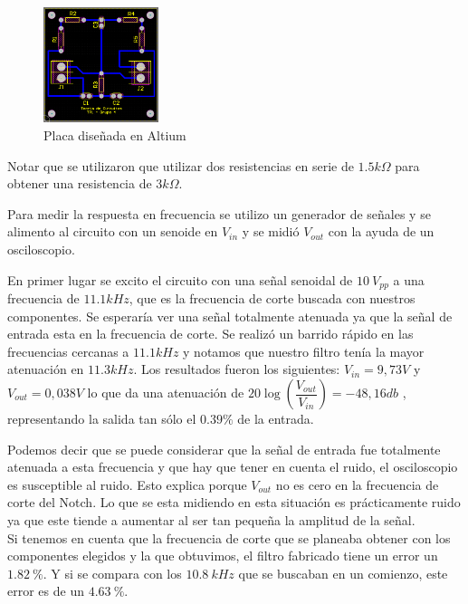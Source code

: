 \begin{figure}[H]                                                       
    \centering\includegraphics[width=0.3\textwidth]{resources/placa_altium.png}
    \caption{Placa diseñada en Altium}
    \label{fig:placa_altium}
    \end{figure}

Notar que se utilizaron que utilizar dos resistencias en serie de $1.5k\Omega$ para obtener una
resistencia de $3k\Omega$. 

Para medir la respuesta en frecuencia se utilizo un generador de señales y se alimento al circuito con un senoide en $V_{in}$ y se midió $V_{out}$ con la ayuda de un osciloscopio.

En primer lugar se excito el circuito con una señal senoidal de $10 \ V_{pp}$ a una frecuencia de $11.1kHz$, que es la frecuencia de corte buscada con nuestros componentes. Se esperaría ver una señal totalmente atenuada ya que la señal de entrada esta en la frecuencia de corte. Se realizó un barrido rápido en las frecuencias cercanas a $11.1kHz$ y notamos que nuestro filtro tenía la mayor atenuación en $11.3kHz$. Los resultados fueron los siguientes: $V_{in}=9,73V$ y $V_{out}= 0,038V$ lo que da una atenuación de $20\log(\dfrac{V_{out}}{V_{in}}) = -48,16db$ , representando la salida tan sólo el $0.39 \%$ de la entrada. 

Podemos decir que se puede considerar que la señal de entrada fue totalmente atenuada a esta frecuencia y que
hay que tener en cuenta el ruido, el 
osciloscopio es susceptible al ruido. Esto explica porque $V_{out}$ no es cero en la frecuencia de corte del Notch. Lo que se esta midiendo en esta situación es prácticamente ruido ya que este tiende a aumentar al ser tan pequeña la amplitud de la señal. \\

Si tenemos en cuenta que la frecuencia de corte que se planeaba obtener con los componentes elegidos y la que obtuvimos, el filtro fabricado tiene un error un $1.82 \ \%$. Y si se compara con los $10.8 \ kHz$ que se buscaban en un comienzo, este error es de un $4.63 \ \%$.

